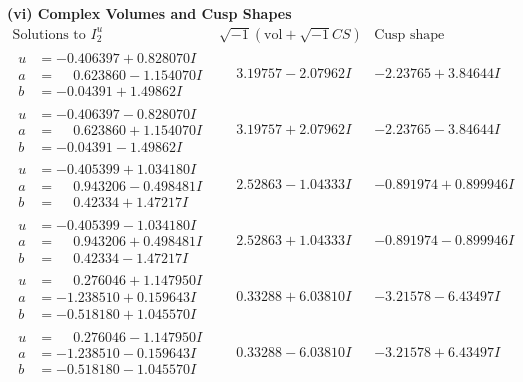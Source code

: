 \documentclass[1p]{elsarticle_modified}
\theoremstyle{definition}
\newcommand{\I}{\sqrt{-1}}
\begin{document}
\newpage\flushleft \textbf{(vi) Complex Volumes and Cusp Shapes}
$$\begin{array}{c|c|c}  
\text{Solutions to }I^u_{2}& \I (\text{vol} + \sqrt{-1}CS) & \text{Cusp shape}\\
 \hline 
\begin{aligned}
u &= -0.406397 + 0.828070 I \\
a &= \phantom{-}0.623860 - 1.154070 I \\
b &= -0.04391 + 1.49862 I\end{aligned}
 & \phantom{-}3.19757 - 2.07962 I & -2.23765 + 3.84644 I \\ \hline\begin{aligned}
u &= -0.406397 - 0.828070 I \\
a &= \phantom{-}0.623860 + 1.154070 I \\
b &= -0.04391 - 1.49862 I\end{aligned}
 & \phantom{-}3.19757 + 2.07962 I & -2.23765 - 3.84644 I \\ \hline\begin{aligned}
u &= -0.405399 + 1.034180 I \\
a &= \phantom{-}0.943206 - 0.498481 I \\
b &= \phantom{-}0.42334 + 1.47217 I\end{aligned}
 & \phantom{-}2.52863 - 1.04333 I & -0.891974 + 0.899946 I \\ \hline\begin{aligned}
u &= -0.405399 - 1.034180 I \\
a &= \phantom{-}0.943206 + 0.498481 I \\
b &= \phantom{-}0.42334 - 1.47217 I\end{aligned}
 & \phantom{-}2.52863 + 1.04333 I & -0.891974 - 0.899946 I \\ \hline\begin{aligned}
u &= \phantom{-}0.276046 + 1.147950 I \\
a &= -1.238510 + 0.159643 I \\
b &= -0.518180 + 1.045570 I\end{aligned}
 & \phantom{-}0.33288 + 6.03810 I & -3.21578 - 6.43497 I \\ \hline\begin{aligned}
u &= \phantom{-}0.276046 - 1.147950 I \\
a &= -1.238510 - 0.159643 I \\
b &= -0.518180 - 1.045570 I\end{aligned}
 & \phantom{-}0.33288 - 6.03810 I & -3.21578 + 6.43497 I \\ \hline\begin{aligned}

\end{aligned}
\end{array}$$
\end{document}
